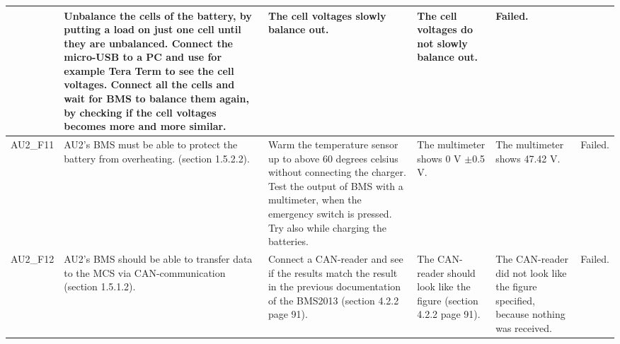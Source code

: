 \begin{longtable}{|p{1.6 cm}|p{2.9 cm}|p{2.9 cm}|p{1.9 cm}|p{1.8 cm}|p{1.8 cm}|}
	& Unbalance the cells of the battery, by putting a load on just one cell until they are unbalanced. Connect the micro-USB to a PC and use for example Tera Term to see the cell voltages. Connect all the cells and wait for BMS to balance them again, by checking if the cell voltages becomes more and more similar.
	& The cell voltages slowly balance out. 
	& The cell voltages do not slowly balance out.
	& Failed.\\ \hline
	AU2\_F11
	& AU2's BMS must be able to protect the battery from overheating.\cite{BMSDocumentation} (section 1.5.2.2).
	& Warm the temperature sensor up to above 60 degrees celsius without connecting the charger. Test the output of BMS with a multimeter, when the emergency switch is pressed. Try also while charging the batteries.
	& The multimeter shows 0 V $\pm$0.5 V.
	& The multimeter shows 47.42 V.
	& Failed.\\ \hline
	AU2\_F12
	& AU2's BMS should be able to transfer data to the MCS via CAN-communication\cite{BMSDocumentation} (section 1.5.1.2).
	& Connect a CAN-reader and see if the results match the result in the previous documentation of the BMS2013\cite{BMSDocumentation} (section 4.2.2 page 91).
	& The CAN-reader should look like the figure\cite{BMSDocumentation} (section 4.2.2 page 91).
	& The CAN-reader did not look like the figure specified, because nothing was received.
	& Failed.\\ \hline	
\end{longtable}